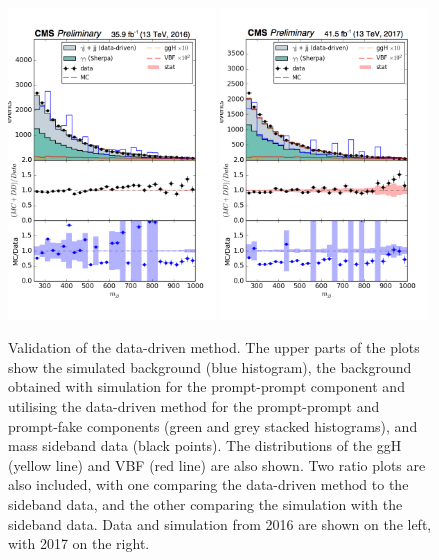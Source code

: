 \begin{figure}
  \centering
  \includegraphics[width=0.49\textwidth]{Figures/Categorisation/DDvalidation_mjj2016.png}
  \includegraphics[width=0.49\textwidth]{Figures/Categorisation/DDvalidation_mjj2017.png}
  \caption[Validation of the data-driven method.]
  {
    Validation of the data-driven method. 
    The upper parts of the plots show the simulated background (blue histogram), 
    the background obtained with simulation for the prompt-prompt component 
    and utilising the data-driven method for the prompt-prompt and prompt-fake components 
    (green and grey stacked histograms),
    and mass sideband data (black points).
    The distributions of the ggH (yellow line) and VBF (red line) are also shown.
    Two ratio plots are also included, with one comparing the data-driven method to the sideband data, 
    and the other comparing the simulation with the sideband data.
    Data and simulation from 2016 are shown on the left, with 2017 on the right.
  }
  \label{fig:cat_DDvalidation}
\end{figure}

